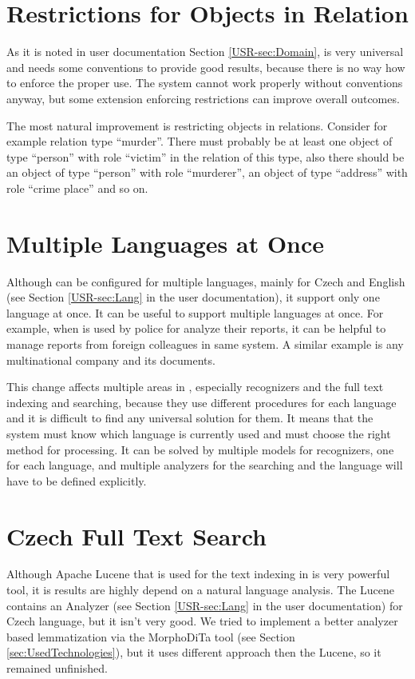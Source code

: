 \section{Restrictions for Objects in Relation}
As it is noted in user documentation Section \ref{USR-sec:Domain},
\textan{} is very universal and needs some conventions to provide good results,
because there is no way how to enforce the proper use. The system cannot work
properly without conventions anyway, but some extension enforcing restrictions
can improve overall outcomes.

The most natural improvement is restricting objects in relations. Consider for
example relation type ``murder''. There must probably be at least one object of
type ``person'' with role ``victim'' in the relation of this type, also there
should be an object of type ``person'' with role ``murderer'', an object of type
``address'' with role ``crime place'' and so on.

\section{Multiple Languages at Once}
Although \textan{} can be configured for multiple languages, mainly for Czech
and English (see Section \ref{USR-sec:Lang} in the user documentation), it
support only one language at once. It can be useful to support multiple
languages at once. For example, when \textan{} is used by police for analyze
their reports, it can be helpful to manage reports from foreign colleagues in
same system. A similar example is any multinational company and its documents.

This change affects multiple areas in \textan{}, especially recognizers and
the full text indexing and searching, because they use different procedures for
each language and it is difficult to find any universal solution for them. It
means that the system must know which language is currently used and must choose
the right method for processing. It can be solved by multiple models for
recognizers, one for each language, and multiple analyzers for the searching and
the language will have to be defined explicitly.

\section{Czech Full Text Search}

Although Apache Lucene that is used for the text indexing in \textan is very
powerful tool, it is results are highly depend on a natural language analysis.
The Lucene contains an Analyzer (see Section \ref{USR-sec:Lang} in the user documentation)
for Czech language, but it isn't very good. We tried to implement a better analyzer
based lemmatization via the MorphoDiTa tool (see Section \ref{sec:UsedTechnologies}),
but it uses different approach then the Lucene, so it remained unfinished.

